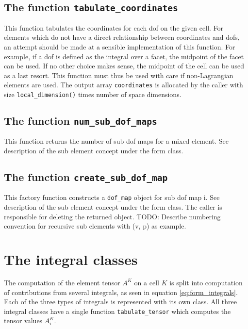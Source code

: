 \subsection{The function \texttt{tabulate\_coordinates}}
This function tabulates the coordinates for each dof on the given cell.
For elements which do not have a direct relationship between coordinates and dofs,
an attempt should be made at a sensible implementation of this function.
For example, if a dof is defined as the integral over a facet, the midpoint
of the facet can be used. If no other choice makes sense, the midpoint of the cell
can be used as a last resort. This function must thus be used with care if
non-Lagrangian elements are used.
The output array \texttt{coordinates} is allocated by the caller with size \texttt{local\_dimension()} times number of space dimensions.


\subsection{The function \texttt{num\_sub\_dof\_maps}}
This function returns the number of sub dof maps for a mixed element.
See description of the sub element concept under the form class.


\subsection{The function \texttt{create\_sub\_dof\_map}}
This factory function constructs a \texttt{dof\_map} object for sub dof map i.
See description of the sub element concept under the form class.
The caller is responsible for deleting the returned object.
TODO: Describe numbering convention for recursive sub elements with (v, p) as example.




\section{The integral classes}

The computation of the element tensor $A^K$ on a cell $K$ is split into computation of
contributions from several integrals, as seen in equation \eqref{eq:form_integrals}.
Each of the three types of integrals is represented with its own class.
All three integral classes have a single function \texttt{tabulate\_tensor} which
computes the tensor values $A_i^K$.

